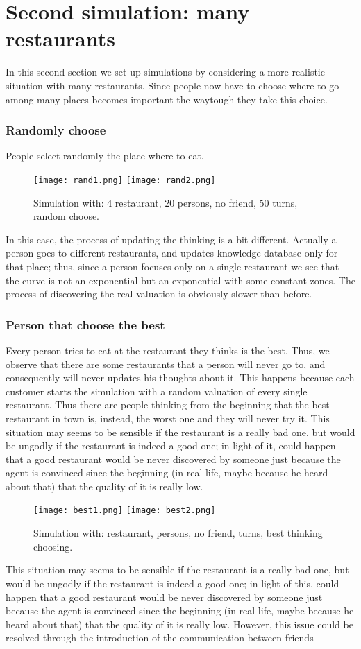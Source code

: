 \documentclass[12pt]{book}
\begin{document}
\section{Second simulation: many restaurants}
In this second section we set up simulations by considering a more realistic situation with many restaurants. Since people now have to choose where to go among many places becomes important the waytough they take this choice. 

\subsubsection{Randomly choose}
People select randomly the place where to eat.
\begin{figure}[h!]
  \centering
  \texttt{[image: rand1.png]}
  \texttt{[image: rand2.png]}
  \caption{Simulation with:  4 restaurant, 20 persons, no friend, 50 turns, random choose.}
\end{figure}

In this case,  the process of updating the thinking is a bit different. Actually a person goes to different restaurants, and updates knowledge database only for that place; thus, since a person focuses only on a single restaurant we see that the curve is not an exponential but an exponential with some constant zones.
The process of discovering the real valuation is obviously slower than before.



\subsubsection{Person that choose the best}
Every person tries to eat at the restaurant they thinks is the best. Thus, we observe that there are some restaurants that a person will never go to, and consequently will never updates his thoughts about it. This happens because each customer starts the simulation with a random valuation of every single restaurant. Thus there are people thinking from the beginning that the best restaurant in town is, instead, the worst one and they will never try it. 
This situation may seems to be sensible if the restaurant is a really bad one, but would be ungodly if the restaurant is indeed a good one; in light of it, could happen that a good restaurant would be never discovered by someone just because the agent is convinced since the beginning (in real life, maybe because he heard about that) that the quality of it is really low.
\begin{figure}[h!]
  \centering
  \texttt{[image: best1.png]}
  \texttt{[image: best2.png]}
  \caption{Simulation with:  restaurant, persons, no friend, turns, best thinking choosing.}
\end{figure}
This situation may seems to be sensible if the restaurant is a really bad one, but would be ungodly if the restaurant is indeed a good one; in light of this, could happen that a good restaurant would be never discovered by someone just because the agent is convinced since the beginning (in real life, maybe because he heard about that) that the quality of it is really low.
However, this issue could be resolved through the introduction of the communication between friends
\end{document}
